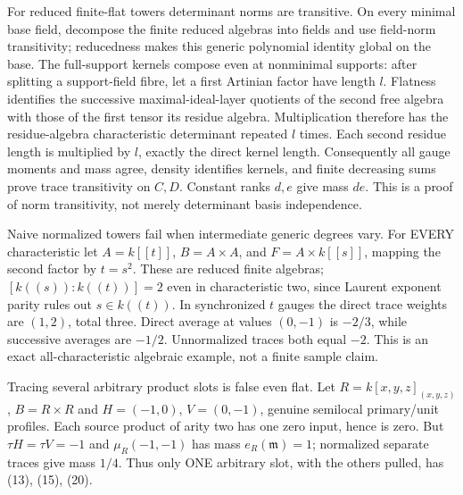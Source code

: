 For reduced finite-flat towers determinant norms are transitive. On every minimal base field, decompose the finite reduced algebras into fields and use field-norm transitivity; reducedness makes this generic polynomial identity global on the base. The full-support kernels compose even at nonminimal supports: after splitting a support-field fibre, let a first Artinian factor have length $l$. Flatness identifies the successive maximal-ideal-layer quotients of the second free algebra with those of the first tensor its residue algebra. Multiplication therefore has the residue-algebra characteristic determinant repeated $l$ times. Each second residue length is multiplied by $l$, exactly the direct kernel length. Consequently all gauge moments and mass agree, density identifies kernels, and finite decreasing sums prove trace transitivity on $C,D$. Constant ranks $d,e$ give mass $de$. This is a proof of norm transitivity, not merely determinant basis independence.

Naive normalized towers fail when intermediate generic degrees vary. For EVERY characteristic let $A=k[[t]]$, $B=A\times A$, and $F=A\times k[[s]]$, mapping the second factor by $t=s^2$. These are reduced finite algebras; $[k((s)):k((t))]=2$ even in characteristic two, since Laurent exponent parity rules out $s\in k((t))$. In synchronized $t$ gauges the direct trace weights are $(1,2)$, total three. Direct average at values $(0,-1)$ is $-2/3$, while successive averages are $-1/2$. Unnormalized traces both equal $-2$. This is an exact all-characteristic algebraic example, not a finite sample claim.

Tracing several arbitrary product slots is false even flat. Let $R=k[x,y,z]_{(x,y,z)}$, $B=R\times R$ and $H=(-1,0)$, $V=(0,-1)$, genuine semilocal primary/unit profiles. Each source product of arity two has one zero input, hence is zero. But $\tau H=\tau V=-1$ and $\mu_R(-1,-1)$ has mass $e_R(\mathfrak m)=1$; normalized separate traces give mass $1/4$. Thus only ONE arbitrary slot, with the others pulled, has (13), (15), (20).

